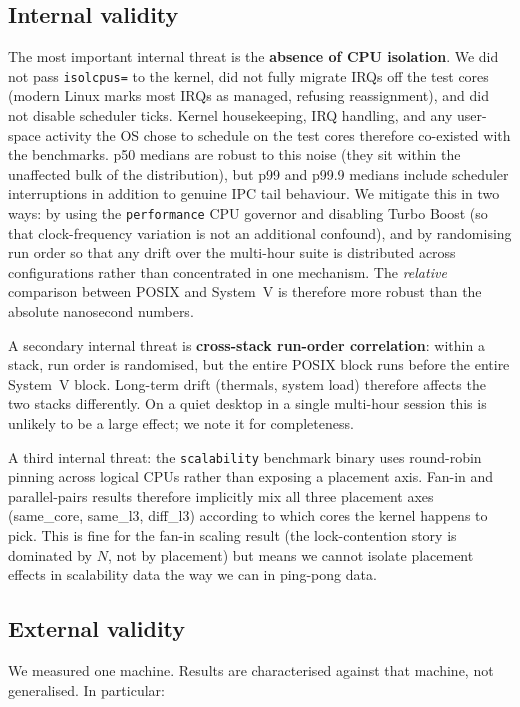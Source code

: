 \documentclass[a4paper,11pt]{article}
\begin{document}
\subsection{Internal validity}
The most important internal threat is the \textbf{absence of CPU
isolation}. We did not pass \texttt{isolcpus=} to the kernel, did not
fully migrate IRQs off the test cores (modern Linux marks most IRQs
as managed, refusing reassignment), and did not disable scheduler
ticks. Kernel housekeeping, IRQ handling, and any user-space activity
the OS chose to schedule on the test cores therefore co-existed with
the benchmarks. p50 medians are robust to this noise (they sit within
the unaffected bulk of the distribution), but p99 and p99.9 medians
include scheduler interruptions in addition to genuine IPC tail
behaviour. We mitigate this in two ways: by using the
\texttt{performance} CPU governor and disabling Turbo Boost (so that
clock-frequency variation is not an additional confound), and by
randomising run order so that any drift over the multi-hour suite is
distributed across configurations rather than concentrated in one
mechanism. The \emph{relative} comparison between POSIX and System~V is
therefore more robust than the absolute nanosecond numbers.

A secondary internal threat is \textbf{cross-stack run-order
correlation}: within a stack, run order is randomised, but the entire
POSIX block runs before the entire System~V block. Long-term drift
(thermals, system load) therefore affects the two stacks differently.
On a quiet desktop in a single multi-hour session this is unlikely to
be a large effect; we note it for completeness.

A third internal threat: the \texttt{scalability} benchmark binary
uses round-robin pinning across logical CPUs rather than exposing a
placement axis. Fan-in and parallel-pairs results therefore implicitly
mix all three placement axes (same\_core, same\_l3, diff\_l3) according
to which cores the kernel happens to pick. This is fine for the fan-in
scaling result (the lock-contention story is dominated by $N$, not by
placement) but means we cannot isolate placement effects in
scalability data the way we can in ping-pong data.

\subsection{External validity}
We measured one machine. Results are characterised against that machine,
not generalised. In particular:
\end{document}
